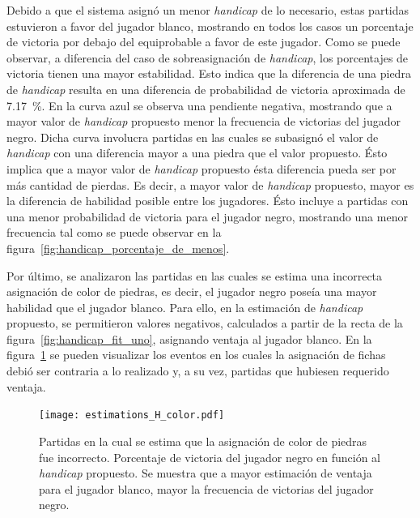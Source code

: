 \documentclass[11pt,twoside,spanish]{report} %
\begin{document}
Debido a que el sistema asign\'o un menor \textit{handicap} de lo necesario, estas partidas estuvieron a favor del jugador blanco, mostrando en todos los casos un porcentaje de victoria por debajo del equiprobable a favor de este jugador.
Como se puede observar, a diferencia del caso de sobreasignaci\'on de \textit{handicap}, los porcentajes de victoria tienen una mayor estabilidad.
Esto indica que la diferencia de una piedra de \textit{handicap} resulta en una diferencia de probabilidad de victoria aproximada de \SI{7.17}{\percent}.
En la curva azul se observa una pendiente negativa, mostrando que a mayor valor de \textit{handicap} propuesto menor la frecuencia de victorias del jugador negro.
Dicha curva involucra partidas en las cuales se subasign\'o el valor de \textit{handicap} con una diferencia mayor a una piedra que el valor propuesto.
\'Esto implica que a mayor valor de \textit{handicap} propuesto \'esta diferencia pueda ser por m\'as cantidad de pierdas.
Es decir, a mayor valor de \textit{handicap} propuesto,  mayor es la diferencia de habilidad posible entre los jugadores.
\'Esto incluye a partidas con una menor probabilidad de victoria para el jugador negro, mostrando una menor frecuencia tal como se puede observar en la figura~\ref{fig:handicap_porcentaje_de_menos}.


Por \'ultimo, se analizaron las partidas en las cuales se estima una incorrecta asignaci\'on de color de piedras, es decir, el jugador negro pose\'ia una mayor habilidad que el jugador blanco.
Para ello, en la estimaci\'on de \textit{handicap} propuesto, se permitieron valores negativos, calculados a partir de la recta de la figura~\ref{fig:handicap_fit_uno}, asignando ventaja al jugador blanco.
En la figura~\ref{fig:estimations_H_color} se pueden visualizar los eventos en los cuales la asignaci\'on de fichas debi\'o ser contraria a lo realizado y, a su vez, partidas que hubiesen requerido ventaja.

\begin{figure}[H]
    \centering
    \texttt{[image: estimations\_H\_color.pdf]}
    \caption{Partidas en la cual se estima que la asignaci\'on de color de piedras fue incorrecto. Porcentaje de victoria del jugador negro en funci\'on al \textit{handicap} propuesto.  Se muestra que a mayor estimaci\'on de ventaja para el jugador blanco,  mayor la frecuencia de victorias del jugador negro.}
    \label{fig:estimations_H_color}
\end{figure}
\end{document}
